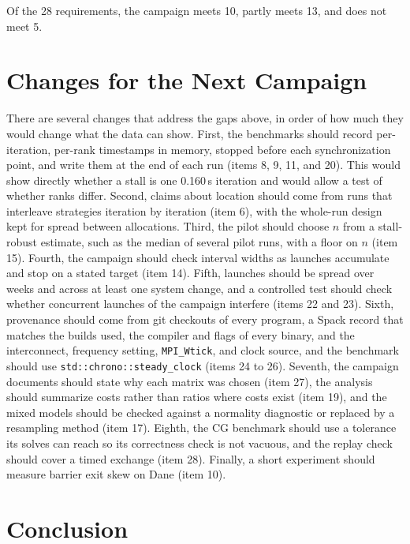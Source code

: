 \documentclass[11pt]{article}
\begin{document}
Of the 28 requirements, the campaign meets 10, partly meets 13, and does not meet 5.

\section{Changes for the Next Campaign}
\label{sec:changes}

There are several changes that address the gaps above, in order of how much they would
change what the data can show. First, the benchmarks should record per-iteration,
per-rank timestamps in memory, stopped before each synchronization point, and write them
at the end of each run (items 8, 9, 11, and 20). This would show directly whether a stall
is one 0.160\,s iteration and would allow a test of whether ranks differ. Second, claims
about location should come from runs that interleave strategies iteration by iteration
(item 6), with the whole-run design kept for spread between allocations. Third, the pilot
should choose $n$ from a stall-robust estimate, such as the median of several pilot runs,
with a floor on $n$ (item 15). Fourth, the campaign should check interval widths as
launches accumulate and stop on a stated target (item 14). Fifth, launches should be
spread over weeks and across at least one system change, and a controlled test should
check whether concurrent launches of the campaign interfere (items 22 and 23). Sixth,
provenance should come from git checkouts of every program, a Spack record that matches
the builds used, the compiler and flags of every binary, and the interconnect, frequency
setting, \texttt{MPI\_Wtick}, and clock source, and the benchmark should use
\texttt{std::chrono::steady\_clock} (items 24 to 26). Seventh, the campaign documents
should state why each matrix was chosen (item 27), the analysis should summarize costs
rather than ratios where costs exist (item 19), and the mixed models should be checked
against a normality diagnostic or replaced by a resampling method (item 17). Eighth, the
CG benchmark should use a tolerance its solves can reach so its correctness check is not
vacuous, and the replay check should cover a timed exchange (item 28). Finally, a short
experiment should measure barrier exit skew on Dane (item 10).

\section{Conclusion}
\end{document}
